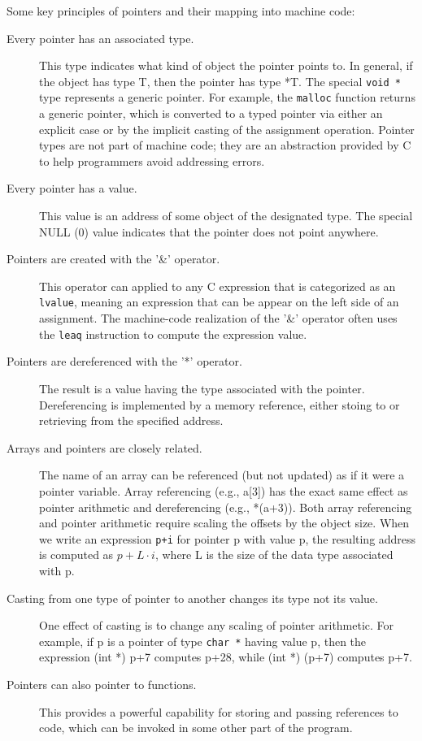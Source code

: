 \documentclass[11pt]{article}
\begin{document}
Some key principles of pointers and their mapping into machine code:\\
\begin{description}
\item[{Every pointer has an associated type.}] This type indicates what kind of object the pointer points to. In general, if the object has type T, then the pointer has type *T. The special \texttt{void *} type represents a generic pointer. For example, the \texttt{malloc} function returns a generic pointer, which is converted to a typed pointer via either an explicit case or by the implicit casting of the assignment operation. Pointer types are not part of machine code; they are an abstraction provided by C to help programmers avoid addressing errors.\\
\item[{Every pointer has a value.}] This value is an address of some object of the designated type. The special NULL (0) value indicates that the pointer does not point anywhere.\\
\item[{Pointers are created with the '\&' operator.}] This operator can applied to any C expression that is categorized as an \texttt{lvalue}, meaning an expression that can be appear on the left side of an assignment. The machine-code realization of the '\&' operator often uses the \texttt{leaq} instruction to compute the expression value.\\
\item[{Pointers are dereferenced with the '*' operator.}] The result is a value having the type associated with the pointer. Dereferencing is implemented by a memory reference, either stoing to or retrieving from the specified address.\\
\item[{Arrays and pointers are closely related.}] The name of an array can be referenced (but not updated) as if it were a pointer variable. Array referencing (e.g., a[3]) has the exact same effect as pointer arithmetic and dereferencing (e.g., *(a+3)). Both array referencing and pointer arithmetic require scaling the offsets by the object size. When we write an expression \texttt{p+i} for pointer p with value p, the resulting address is computed as \(p + L \cdot i\), where L is the size of the data type associated with p.\\
\item[{Casting from one type of pointer to another changes its type not its value.}] One effect of casting is to change any scaling of pointer arithmetic. For example, if p is a pointer of type \texttt{char *} having value p, then the expression (int *) p+7 computes p+28, while (int *) (p+7) computes p+7.\\
\item[{Pointers can also pointer to functions.}] This provides a powerful capability for storing and passing references to code, which can be invoked in some other part of the program.\\
\end{description}
\end{document}
